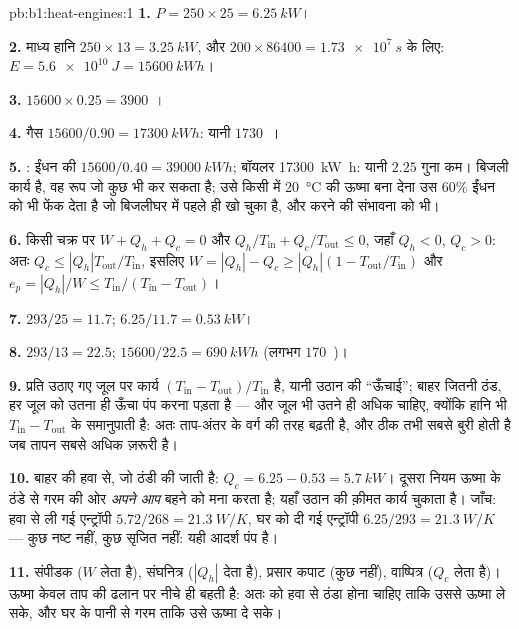 \begin{solution}{pb:b1:heat-engines:1}
\textbf{1.} $P = 250 \times 25 = \qty{6.25}{kW}$।

\textbf{2.} माध्य हानि $250 \times 13 = \qty{3.25}{kW}$, और $200 \times 86400 =
\qty{1.73e7}{s}$ के लिए: $E = \qty{5.6e10}{J} = \qty{15600}{kW h}$।

\textbf{3.} $15600 \times 0.25 = 3900$~\texteuro।

\textbf{4.} गैस $15600/0.90 = \qty{17300}{kW h}$: यानी $1730$~\texteuro।

\textbf{5.} : ईंधन की $15600/0.40 = \qty{39000}{kW h}$; बॉयलर
\qty{17300}{kW h}: यानी $2.25$ गुना कम। बिजली कार्य है, वह रूप जो कुछ भी कर
सकता है; उसे किसी  में \qty{20}{\degreeCelsius} की ऊष्मा बना देना
उस $60\%$ ईंधन को भी फेंक देता है जो बिजलीघर में पहले ही खो चुका है, और
 करने की संभावना को भी।

\textbf{6.} किसी चक्र पर $W + Q_h + Q_c = 0$ और $Q_h/T_{\mathrm{in}} +
Q_c/T_{\mathrm{out}} \leq 0$, जहाँ $Q_h < 0$, $Q_c > 0$: अतः $Q_c \leq
|Q_h|T_{\mathrm{out}}/T_{\mathrm{in}}$, इसलिए $W = |Q_h| - Q_c \geq |Q_h|(1 -
T_{\mathrm{out}}/T_{\mathrm{in}})$ और $e_p = |Q_h|/W \leq T_{\mathrm{in}}/(T_{\mathrm{in}} -
T_{\mathrm{out}})$।

\textbf{7.} $293/25 = 11.7$; $6.25/11.7 = \qty{0.53}{kW}$।

\textbf{8.} $293/13 = 22.5$; $15600/22.5 = \qty{690}{kW h}$ (लगभग
$170$~\texteuro)।

\textbf{9.} प्रति उठाए गए जूल पर कार्य $(T_{\mathrm{in}} - T_{\mathrm{out}})/
T_{\mathrm{in}}$ है, यानी उठान की ``ऊँचाई''; बाहर जितनी ठंड, हर जूल को उतना
ही ऊँचा पंप करना पड़ता है --- और जूल भी उतने ही अधिक चाहिए, क्योंकि हानि भी
$T_{\mathrm{in}} - T_{\mathrm{out}}$ के समानुपाती है: अतः 
ताप-अंतर के वर्ग की तरह बढ़ती है, और ठीक तभी सबसे बुरी होती है जब तापन सबसे
अधिक ज़रूरी है।

\textbf{10.} बाहर की हवा से, जो ठंडी की जाती है: $Q_c = 6.25 - 0.53 =
\qty{5.7}{kW}$। दूसरा नियम ऊष्मा के ठंडे से गरम की ओर \emph{अपने आप} बहने को
मना करता है; यहाँ उठान की क़ीमत कार्य चुकाता है। जाँच: हवा से ली गई
एन्ट्रॉपी $5.72/268 = \qty{21.3}{W/K}$, घर को दी गई एन्ट्रॉपी $6.25/293 =
\qty{21.3}{W/K}$ --- कुछ नष्ट नहीं, कुछ सृजित नहीं: यही आदर्श पंप है।

\textbf{11.} संपीडक ($W$ लेता है), संघनित्र ($|Q_h|$ देता है),
प्रसार कपाट (कुछ नहीं), वाष्पित्र ($Q_c$ लेता है)। ऊष्मा केवल ताप की ढलान
पर नीचे ही बहती है: अतः  को हवा से ठंडा होना चाहिए ताकि उससे ऊष्मा ले
सके, और घर के पानी से गरम ताकि उसे ऊष्मा दे सके।


\end{solution}
